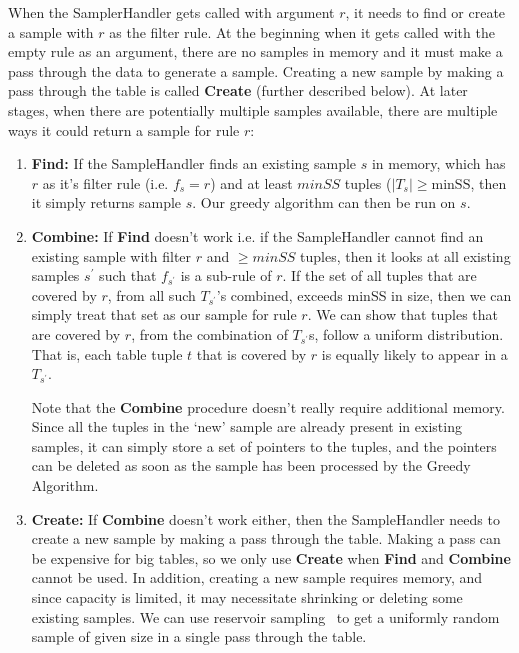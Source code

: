 \documentclass{sig-alternate}
\begin{document}
When the SamplerHandler gets called with argument $r$, it needs to find or create a sample with $r$ as the filter rule. At the beginning when it gets called with the empty rule as an argument, there are no samples in memory and it must make a pass through the data to generate a sample. Creating a new sample by making a pass through the table is called \textbf{Create} (further described below). At later stages, when there are potentially multiple samples available, there are multiple ways it could return a sample for rule $r$:
\begin{enumerate}
\item \textbf{Find:} If the SampleHandler finds an existing sample $s$ in memory, which has $r$ as it's filter rule (i.e. $f_s = r$) and at least $minSS$ tuples ($|T_s| \geq \text{minSS}$, then it simply returns sample $s$. Our greedy algorithm can then be run on $s$. 

\item \textbf{Combine:} If \textbf{Find} doesn't work i.e. if the SampleHandler cannot find an existing sample with filter $r$ and $\geq minSS$ tuples, then it looks at all existing samples $s^{\prime}$ such that $f_{s^{\prime}}$ is a sub-rule of $r$. If the set of all tuples that are covered by $r$, from all such $T_{s^{\prime}}$'s combined, exceeds minSS in size, then we can simply treat that set as our sample for rule $r$.
We can show that tuples that are covered by $r$, from the combination of $T_{s^{\prime}}$s, follow a uniform distribution. That is, each table tuple $t$ that is covered by $r$ is equally likely to appear in a $T_{s^{\prime}}$. 

Note that the \textbf{Combine} procedure doesn't really require additional memory. Since all the tuples in the `new' sample are already present in existing samples, it can simply store a set of pointers to the tuples, and the pointers can be deleted as soon as the sample has been processed by the Greedy Algorithm. 

\item \textbf{Create:} If \textbf{Combine} doesn't work either, then the SampleHandler needs to create a new sample by making a pass through the table. Making a pass can be expensive for big tables, so we only use \textbf{Create} when \textbf{Find} and \textbf{Combine} cannot be used. In addition, creating a new sample requires memory, and since capacity is limited, it may necessitate shrinking or deleting some existing samples. 
We can use reservoir sampling~\cite{maibdr1983,Vitter:1985:RSR:3147.3165} to get a uniformly random sample of given size in a single pass through the table. 


\end{enumerate}
\end{document}
